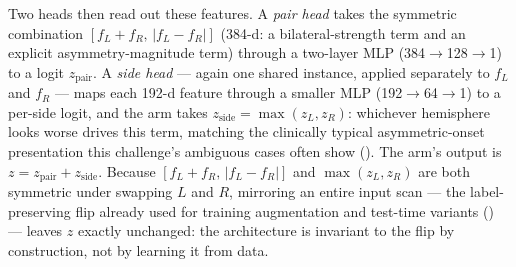 \documentclass[11pt]{article}
\begin{document}
Two heads then read out these features. A \emph{pair head} takes the symmetric combination $[f_L+f_R,\,|f_L-f_R|]$ (384-d: a bilateral-strength term and an explicit asymmetry-magnitude term) through a two-layer MLP (384$\to$128$\to$1) to a logit $z_{\text{pair}}$. A \emph{side head} --- again one shared instance, applied separately to $f_L$ and $f_R$ --- maps each 192-d feature through a smaller MLP (192$\to$64$\to$1) to a per-side logit, and the arm takes $z_{\text{side}} = \max(z_L, z_R)$: whichever hemisphere looks worse drives this term, matching the clinically typical asymmetric-onset presentation this challenge's ambiguous cases often show (). The arm's output is $z = z_{\text{pair}} + z_{\text{side}}$. Because $[f_L+f_R,\,|f_L-f_R|]$ and $\max(z_L,z_R)$ are both symmetric under swapping $L$ and $R$, mirroring an entire input scan --- the label-preserving flip already used for training augmentation and test-time variants () --- leaves $z$ exactly unchanged: the architecture is invariant to the flip by construction, not by learning it from data.
\end{document}
